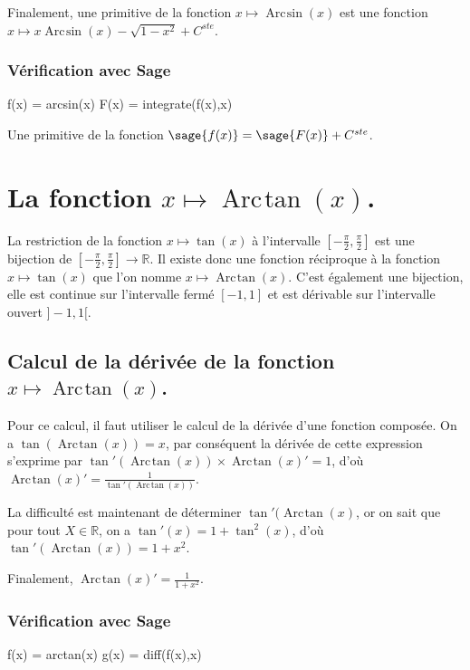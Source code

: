 \documentclass[a4paper,12pt]{report}
\def\eclaire{\mathbb}
\def\R{\ensuremath{\eclaire R}}
\renewcommand{\arcsin}{\mathop{\mathrm{Arc\mspace{2mu}sin}}}
\renewcommand{\arctan}{\mathop{\mathrm{Arc\mspace{2mu}tan}}}
\begin{document}
Finalement, une primitive de la fonction $x \mapsto \arcsin(x) $ est une fonction  $ x \mapsto x \arcsin(x) - \sqrt{1- x^2} + C^{ste} $.

\subsubsection{Vérification avec Sage}

\begin{sageblock}
    f(x) = arcsin(x)
    F(x) = integrate(f(x),x)
\end{sageblock}

Une primitive de la fonction $\sage{f(x)} = \sage{F(x)} + C^{ste}$.


\section{La fonction  $x \mapsto \arctan(x) $.}


La restriction de la fonction $x \mapsto \tan(x) $ à l'intervalle $\left[-\frac{\pi}{2},\frac{\pi}{2}\right]$ est une bijection de $\left[-\frac{\pi}{2},\frac{\pi}{2}\right] \rightarrow \R $. Il existe donc une fonction réciproque à la fonction $x \mapsto \tan(x) $ que l'on nomme $x \mapsto \arctan(x) $. C'est également une bijection, elle est continue sur l'intervalle fermé  $ [-1,1]$ et est dérivable sur l'intervalle ouvert $]-1,1[$.


\subsection{Calcul de la dérivée de la fonction $x \mapsto \arctan(x) $.}


Pour ce calcul, il faut utiliser le calcul de la dérivée d'une fonction composée. On a $\tan(\arctan(x))=x$, par conséquent la dérivée de cette expression s'exprime par $ \tan'(\arctan(x)) \times \arctan(x)' = 1$, d'où $\arctan(x)' = \frac{1}{\tan'(\arctan(x))} $.

La difficulté est maintenant de déterminer $\tan'(\arctan(x)$, or on sait que pour tout $X \in \R$, on a $ \tan'(x) =1+\tan^2(x) $, d'où $\tan'(\arctan(x)) = 1+x^2$.

Finalement, $\arctan(x)' = \frac{1}{1+x^2}$.

\subsubsection*{Vérification avec Sage}

\begin{sageblock}
    f(x) = arctan(x)
    g(x) = diff(f(x),x)
\end{sageblock}
\end{document}
